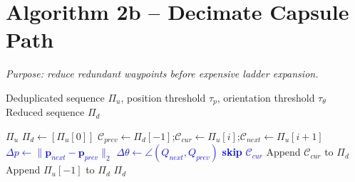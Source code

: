 \documentclass[11pt]{article}
\newcommand{\chg}[1]{\textcolor{blue}{#1}}
\newcommand{\AlgTarget}[1]{\hypertarget{#1}{}}
\begin{document}
\section*{Algorithm 2b -- Decimate Capsule Path}
\noindent\textit{Purpose: reduce redundant waypoints before expensive ladder expansion.}
\AlgTarget{alg:decimate_capsule_path}
\begin{algorithm}[H]
\caption{\textsc{DecimateCapsulePath}($\Pi_u,\,\tau_p,\,\tau_\theta$)}
\begin{algorithmic}[1]
\Require Deduplicated sequence $\Pi_u$, position threshold $\tau_p$, orientation threshold $\tau_\theta$
\Ensure  Reduced sequence $\Pi_d$

  \State \Return $\Pi_u$
\EndIf
\State $\Pi_d \gets [\Pi_u[0]]$
  \State $\mathcal{C}_{prev} \gets \Pi_d[-1]$;\quad $\mathcal{C}_{cur} \gets \Pi_u[i]$;\quad $\mathcal{C}_{next} \gets \Pi_u[i+1]$
  \State \chg{$\Delta p \gets \|\mathbf{p}_{next}-\mathbf{p}_{prev}\|_2$}
  \State \chg{$\Delta \theta \gets \angle(Q_{next},Q_{prev})$}
  \If{\chg{$\Delta p < \tau_p$ and $\Delta\theta < \tau_\theta$}}
    \State \chg{\textbf{skip} $\mathcal{C}_{cur}$}
  \Else
    \State Append $\mathcal{C}_{cur}$ to $\Pi_d$
  \EndIf
\EndFor
\State Append $\Pi_u[-1]$ to $\Pi_d$
\State \Return $\Pi_d$
\end{algorithmic}
\end{algorithm}

\end{document}
